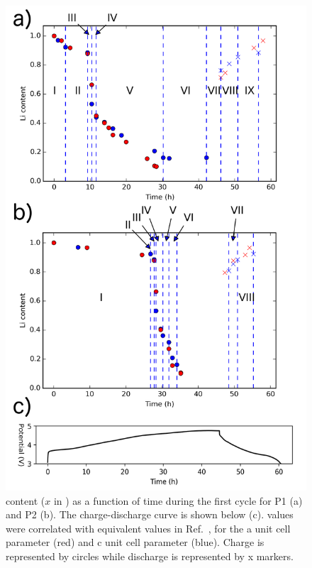 \documentclass{article}
\begin{document}
\begin{figure}
  \centering
  \includegraphics[width=\linewidth, height=0.8\textheight,keepaspectratio]{figures/rate-plots.png}
  \caption{ content ($x$ in
    ) as a function of time
    during the first cycle for P1 (a) and P2 (b). The charge-discharge
    curve is shown below (c).  values were correlated with
    equivalent values in Ref.\ \cite{robert2015}, for the a unit cell
    parameter (red) and c unit cell parameter (blue). Charge is
    represented by circles while discharge is represented by x
    markers.}
  \label{fig:rates}
\end{figure}

\clearpage
\pagebreak



\end{document}
